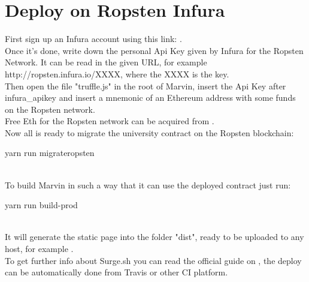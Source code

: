 \documentclass[ManualeSviluppatore]{subfiles}
\begin{document}
\section{Deploy on Ropsten Infura}
First sign up an Infura account using this link: . \\
Once it's done, write down the personal Api Key given by Infura for the Ropsten Network. It can be read in the given URL, for example http://ropsten.infura.io/XXXX, where the XXXX is the key. \\

Then open the file "truffle.js" in the root of Marvin, insert the Api Key after infura\_apikey and insert a mnemonic of an Ethereum address with some funds on the Ropsten network.\\
Free Eth for the Ropsten network can be acquired from .\\

Now all is ready to migrate the university contract on the Ropsten blockchain: \\
\begin{ttfamily} yarn run migrateropsten \end{ttfamily} \\

To build Marvin in such a way that it can use the deployed contract just run:  \\
\begin{ttfamily} yarn run build-prod \end{ttfamily} \\
It will generate the static page into the folder "dist", ready to be uploaded to any host, for example . \\

To get further info about Surge.sh you can read the official guide on , the deploy can be automatically done from Travis or other CI platform.
\end{document}
